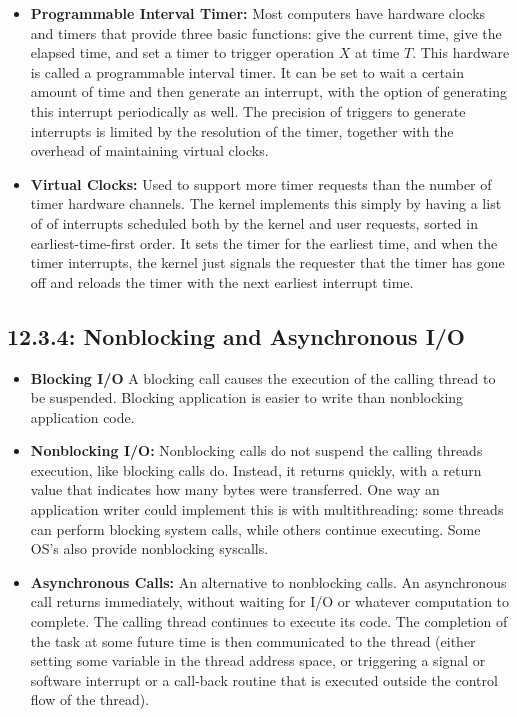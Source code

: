 \documentclass[12pt]{article}
\begin{document}
\begin{itemize}
    \item \textbf{Programmable Interval Timer:} Most computers have hardware clocks and timers that provide three basic functions: give the current time, give the elapsed time, and set a timer to trigger operation \(X\) at time \(T\). This hardware is called a programmable interval timer. It can be set to wait a certain amount of time and then generate an interrupt, with the option of generating this interrupt periodically as well. The precision of triggers to generate interrupts is limited by the resolution of the timer, together with the overhead of maintaining virtual clocks.
    \item \textbf{Virtual Clocks:} Used to support more timer requests than the number of timer hardware channels. The kernel implements this simply by having a list of of interrupts scheduled both by the kernel and user requests, sorted in earliest-time-first order. It sets the timer for the earliest time, and when the timer interrupts, the kernel just signals the requester that the timer has gone off and reloads the timer with the next earliest interrupt time.
\end{itemize}

\subsection*{12.3.4: Nonblocking and Asynchronous I/O}

\begin{itemize}
    \item \textbf{Blocking I/O} A blocking call causes the execution of the calling thread to be suspended. Blocking application is easier to write than nonblocking application code.
    \item \textbf{Nonblocking I/O:} Nonblocking calls do not suspend the calling threads execution, like blocking calls do. Instead, it returns quickly, with a return value that indicates how many bytes were transferred. One way an application writer could implement this is with multithreading: some threads can perform blocking system calls, while others continue executing. Some OS's also provide nonblocking syscalls.
    \item \textbf{Asynchronous Calls:} An alternative to nonblocking calls. An asynchronous call returns immediately, without waiting for I/O or whatever computation to complete. The calling thread continues to execute its code. The completion of the task at some future time is then communicated to the thread (either setting some variable in the thread address space, or triggering a signal or software interrupt or a call-back routine that is executed outside the control flow of the thread).
\end{itemize}
\end{document}
